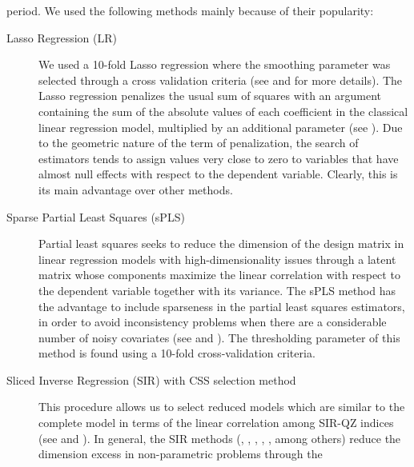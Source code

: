 \documentclass[11pt]{amsart}
\theoremstyle{plain}
\theoremstyle{definition}
\theoremstyle{remark}
\begin{document}
period. We used the following methods mainly because of their popularity:
\begin{description}
\item[Lasso Regression (LR)]
We used a 10-fold Lasso regression where the smoothing parameter was selected
through a cross validation criteria (see \cite{Tibshirani1996} and \cite{Friedman2010} for more details). %
 The Lasso regression penalizes the usual sum of squares with an argument
 containing the sum of the absolute values of each coefficient in the classical
 linear regression model, multiplied by an additional parameter (see \cite{Tibshirani1996}). Due
 to the geometric nature of the term of penalization, the search of estimators
 tends to assign values very close to zero to variables that have almost null
 effects with respect to the dependent variable. Clearly, this is its main advantage
 over other methods.
\item[Sparse Partial Least Squares (sPLS)] 
  Partial least squares seeks to reduce the dimension of the design matrix in
  linear regression models with high-dimensionality issues through a latent matrix
  whose components maximize the linear correlation with respect to the
  dependent variable together with its variance. The sPLS method has the advantage to include sparseness in the partial least squares
  estimators, in order to avoid inconsistency problems when there are a
  considerable number of noisy covariates (see \cite{Chun2010} and \cite{Chung2013}). The
  thresholding parameter of this method is found using a 10-fold cross-validation criteria.    
\item[Sliced Inverse Regression (SIR) with CSS selection method]
  This procedure allows us to select reduced models which are similar to the
  complete model in terms of the linear correlation among SIR-QZ indices (see
  \cite{Coudret2014} and \cite{Coudret2017}). In general, the SIR methods (\cite{Li1991},
  \cite{Duan1991}, \cite{Zhong2005}, \cite{Li2008}, \cite{Coudret2014}, \cite{Weisberg2002} among
  others) reduce the dimension excess in non-parametric problems through the

\end{description}
\end{document}
